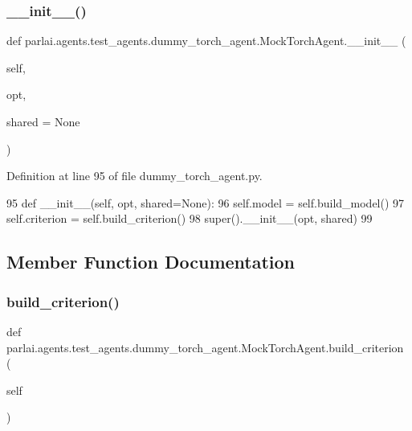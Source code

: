 \subsubsection{\texorpdfstring{\+\_\+\+\_\+init\+\_\+\+\_\+()}{\_\_init\_\_()}}
{\footnotesize\ttfamily def parlai.\+agents.\+test\+\_\+agents.\+dummy\+\_\+torch\+\_\+agent.\+Mock\+Torch\+Agent.\+\_\+\+\_\+init\+\_\+\+\_\+ (\begin{DoxyParamCaption}\item[{}]{self,  }\item[{}]{opt,  }\item[{}]{shared = {\ttfamily None} }\end{DoxyParamCaption})}



Definition at line 95 of file dummy\+\_\+torch\+\_\+agent.\+py.


\begin{DoxyCode}
95     \textcolor{keyword}{def }\_\_init\_\_(self, opt, shared=None):
96         self.model = self.build\_model()
97         self.criterion = self.build\_criterion()
98         super().\_\_init\_\_(opt, shared)
99 
\end{DoxyCode}


\subsection{Member Function Documentation}
\mbox{\label{classparlai_1_1agents_1_1test__agents_1_1dummy__torch__agent_1_1MockTorchAgent_a457b269132e6c4ec92308ce87aa85336}} 
\subsubsection{\texorpdfstring{build\+\_\+criterion()}{build\_criterion()}}
{\footnotesize\ttfamily def parlai.\+agents.\+test\+\_\+agents.\+dummy\+\_\+torch\+\_\+agent.\+Mock\+Torch\+Agent.\+build\+\_\+criterion (\begin{DoxyParamCaption}\item[{}]{self }\end{DoxyParamCaption})}



